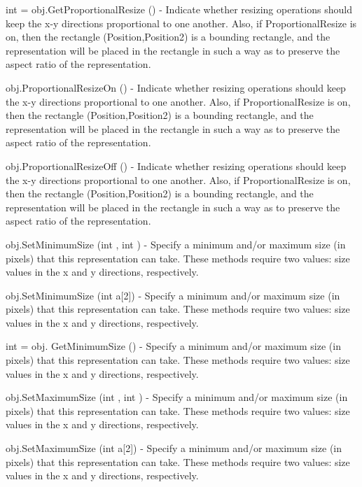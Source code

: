 \begin{DoxyItemize}
\item {\ttfamily int = obj.\-Get\-Proportional\-Resize ()} -\/ Indicate whether resizing operations should keep the x-\/y directions proportional to one another. Also, if Proportional\-Resize is on, then the rectangle (Position,Position2) is a bounding rectangle, and the representation will be placed in the rectangle in such a way as to preserve the aspect ratio of the representation.  
\item {\ttfamily obj.\-Proportional\-Resize\-On ()} -\/ Indicate whether resizing operations should keep the x-\/y directions proportional to one another. Also, if Proportional\-Resize is on, then the rectangle (Position,Position2) is a bounding rectangle, and the representation will be placed in the rectangle in such a way as to preserve the aspect ratio of the representation.  
\item {\ttfamily obj.\-Proportional\-Resize\-Off ()} -\/ Indicate whether resizing operations should keep the x-\/y directions proportional to one another. Also, if Proportional\-Resize is on, then the rectangle (Position,Position2) is a bounding rectangle, and the representation will be placed in the rectangle in such a way as to preserve the aspect ratio of the representation.  
\item {\ttfamily obj.\-Set\-Minimum\-Size (int , int )} -\/ Specify a minimum and/or maximum size (in pixels) that this representation can take. These methods require two values\-: size values in the x and y directions, respectively.  
\item {\ttfamily obj.\-Set\-Minimum\-Size (int a\mbox{[}2\mbox{]})} -\/ Specify a minimum and/or maximum size (in pixels) that this representation can take. These methods require two values\-: size values in the x and y directions, respectively.  
\item {\ttfamily int = obj. Get\-Minimum\-Size ()} -\/ Specify a minimum and/or maximum size (in pixels) that this representation can take. These methods require two values\-: size values in the x and y directions, respectively.  
\item {\ttfamily obj.\-Set\-Maximum\-Size (int , int )} -\/ Specify a minimum and/or maximum size (in pixels) that this representation can take. These methods require two values\-: size values in the x and y directions, respectively.  
\item {\ttfamily obj.\-Set\-Maximum\-Size (int a\mbox{[}2\mbox{]})} -\/ Specify a minimum and/or maximum size (in pixels) that this representation can take. These methods require two values\-: size values in the x and y directions, respectively.  

\end{DoxyItemize}
